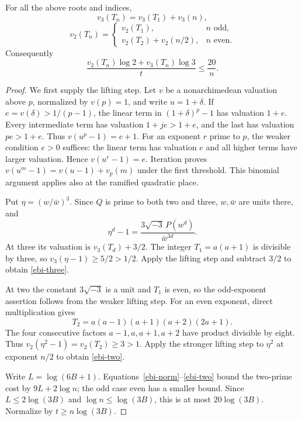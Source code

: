 \begin{lemma}\label{ebi-fixed-depth}
For all the above roots and indices,
\begin{equation}\label{ebi-three}
 v_3(T_n)=v_3(T_1)+v_3(n),
\end{equation}
\begin{equation}\label{ebi-two}
 v_2(T_n)=
 \begin{cases}
  v_2(T_1),&n\text{ odd},\\
  v_2(T_2)+v_2(n/2),&n\text{ even}.
 \end{cases}
\end{equation}
Consequently
\begin{equation}\label{ebi-small-cost}
 \frac{v_2(T_n)\log2+v_3(T_n)\log3}{t}\le\frac{20}{n}.
\end{equation}
\end{lemma}
\begin{proof}
We first supply the lifting step. Let $v$ be a nonarchimedean
valuation above $p$, normalized by $v(p)=1$, and write $u=1+\delta$.
If $e=v(\delta)>1/(p-1)$, the linear term in
$(1+\delta)^p-1$ has valuation $1+e$. Every intermediate term
has valuation $1+je>1+e$, and the last has valuation $pe>1+e$.
Thus $v(u^p-1)=e+1$. For an exponent $r$ prime to $p$, the weaker
condition $e>0$ suffices: the linear term has valuation $e$ and all
higher terms have larger valuation. Hence $v(u^r-1)=e$.
Iteration proves $v(u^m-1)=v(u-1)+v_p(m)$ under the first threshold.
This binomial argument applies also at the ramified quadratic place.

Put $\eta=(w/\bar w)^3$. Since $Q$ is prime to both two and three,
$w,\bar w$ are units there, and
\begin{equation}\label{ebi-local-identity}
 \eta^d-1=\frac{3\sqrt{-3}\,P(w^d)}{\bar w^{3d}}.
\end{equation}
At three its valuation is $v_3(T_d)+3/2$. The integer
$T_1=a(a+1)$ is divisible by three, so $v_3(\eta-1)\ge5/2>1/2$.
Apply the lifting step and subtract $3/2$ to obtain
\eqref{ebi-three}.

At two the constant $3\sqrt{-3}$ is a unit and $T_1$ is even,
so the odd-exponent assertion follows from the weaker lifting step.
For an even exponent, direct multiplication gives
\begin{equation}\label{ebi-t2}
 T_2=a(a-1)(a+1)(a+2)(2a+1).
\end{equation}
The four consecutive factors $a-1,a,a+1,a+2$ have product divisible
by eight. Thus $v_2(\eta^2-1)=v_2(T_2)\ge3>1$.
Apply the stronger lifting step to $\eta^2$ at exponent $n/2$ to
obtain \eqref{ebi-two}.

Write $L=\log(6B+1)$. Equations~\eqref{ebi-norm}--\eqref{ebi-two}
bound the two-prime cost by $9L+2\log n$; the odd case even has
a smaller bound. Since $L\le2\log(3B)$ and
$\log n\le\log(3B)$, this is at most $20\log(3B)$.
Normalize by $t\ge n\log(3B)$.
\end{proof}

